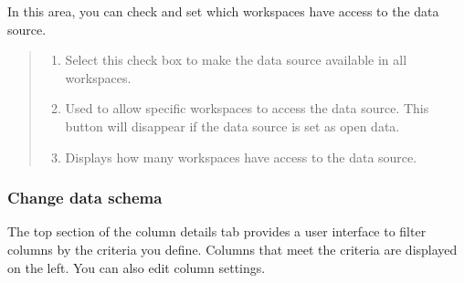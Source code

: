 \documentclass[letterpaper,10pt,english]{sphinxmanual}
\begin{document}

In this area, you can check and set which workspaces have access to the data source.
\begin{quote}

\begin{figure}[H]
\centering

\noindent{}
\end{figure}
\begin{enumerate}
\def\theenumi{\arabic{enumi}}
\def\labelenumi{\theenumi .}
\makeatletter\def\p@enumii{\p@enumi \theenumi .}\makeatother
\item {} 
 Select this check box to make the data source available in all workspaces.

\item {} 
 Used to allow specific workspaces to access the data source. This button will disappear if the data source is set as open data.

\item {} 
 Displays how many workspaces have access to the data source.

\end{enumerate}
\end{quote}


\subsubsection{Change data schema}
\label{\detokenize{discovery/part02/data_source_detail_view:id4}}
The top section of the column details tab provides a user interface to filter columns by the criteria you define. Columns that meet the criteria are displayed on the left. You can also edit column settings.
\end{document}
